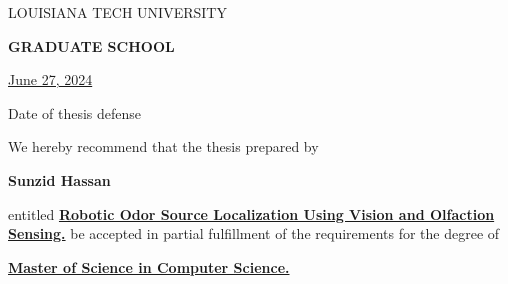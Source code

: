 \begin{center}
    LOUISIANA TECH UNIVERSITY

    \textbf{GRADUATE SCHOOL}
\end{center}

\begin{flushright}
    \underline{June 27, 2024}
    
    Date of thesis defense
\end{flushright}

\noindent We hereby recommend that the thesis prepared by 

\begin{singlespace}
\noindent\textbf{Sunzid Hassan}

\noindent\makebox[\linewidth]{\rule{\columnwidth}{0.4pt}}

\noindent entitled \underline{\textbf{Robotic Odor Source Localization Using Vision and Olfaction Sensing.}}
be accepted in partial fulfillment of the requirements for the degree of 

\noindent\underline{\textbf{Master of Science in Computer Science.}}

\end{singlespace}
